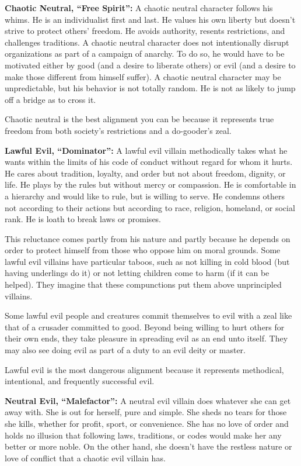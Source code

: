 \textbf{Chaotic Neutral, ``Free Spirit'':} A chaotic neutral character follows his whims. He is an individualist first and last. He values his own liberty but doesn't strive to protect others' freedom. He avoids authority, resents restrictions, and challenges traditions. A chaotic neutral character does not intentionally disrupt organizations as part of a campaign of anarchy. To do so, he would have to be motivated either by good (and a desire to liberate others) or evil (and a desire to make those different from himself suffer). A chaotic neutral character may be unpredictable, but his behavior is not totally random. He is not as likely to jump off a bridge as to cross it.

Chaotic neutral is the best alignment you can be because it represents true freedom from both society's restrictions and a do-gooder's zeal.

\textbf{Lawful Evil, ``Dominator'':} A lawful evil villain methodically takes what he wants within the limits of his code of conduct without regard for whom it hurts. He cares about tradition, loyalty, and order but not about freedom, dignity, or life. He plays by the rules but without mercy or compassion. He is comfortable in a hierarchy and would like to rule, but is willing to serve. He condemns others not according to their actions but according to race, religion, homeland, or social rank. He is loath to break laws or promises.

This reluctance comes partly from his nature and partly because he depends on order to protect himself from those who oppose him on moral grounds. Some lawful evil villains have particular taboos, such as not killing in cold blood (but having underlings do it) or not letting children come to harm (if it can be helped). They imagine that these compunctions put them above unprincipled villains.

Some lawful evil people and creatures commit themselves to evil with a zeal like that of a crusader committed to good. Beyond being willing to hurt others for their own ends, they take pleasure in spreading evil as an end unto itself. They may also see doing evil as part of a duty to an evil deity or master.

Lawful evil is the most dangerous alignment because it represents methodical, intentional, and frequently successful evil.

\textbf{Neutral Evil, ``Malefactor'':} A neutral evil villain does whatever she can get away with. She is out for herself, pure and simple. She sheds no tears for those she kills, whether for profit, sport, or convenience. She has no love of order and holds no illusion that following laws, traditions, or codes would make her any better or more noble. On the other hand, she doesn't have the restless nature or love of conflict that a chaotic evil villain has.

